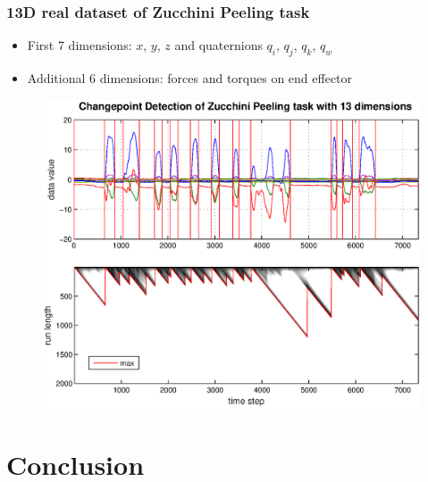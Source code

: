 \documentclass{beamer} %
\begin{document}
\begin{frame}
\frametitle{13D real dataset of Zucchini Peeling task}
\begin{itemize}
\item First 7 dimensions: $x$, $y$, $z$ and quaternions $q_i$, $q_j$, $q_k$, $q_w$
\item Additional 6 dimensions: forces and torques on end effector
\end{itemize}
\begin{figure}
\centering
\includegraphics[height=.76\textheight]{proc2.eps}
\end{figure}
\end{frame}



\section{Conclusion}
\end{document}
